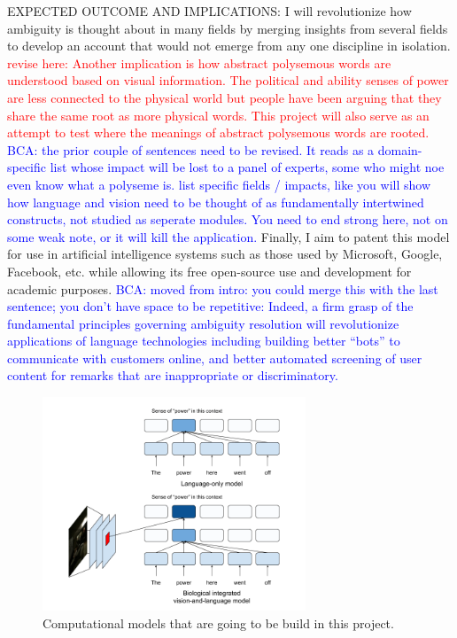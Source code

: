 \documentclass[letterpaper, 12pt]{article}
\newcommand{\bca}[1]{\textcolor{blue}{BCA: #1}} %
\newcommand{\todo}[1]{\textcolor{red}{#1}} %
\begin{document}
EXPECTED OUTCOME AND IMPLICATIONS: I will revolutionize how ambiguity is thought about in many fields by merging insights from several fields to develop an account that would not emerge from any one discipline in isolation. \todo{revise here: Another implication is how abstract polysemous words are understood based on visual information. The political and ability senses of power are less connected to the physical world but people have been arguing that they share the same root as more physical words. This project will also serve as an attempt to test where the meanings of abstract polysemous words are rooted. }  \bca{the prior couple of sentences need to be revised.  It reads as a domain-specific list whose impact will be lost to a panel of experts, some who might noe even know what a polyseme is.  list specific fields / impacts, like you will show how language and vision need to be thought of as fundamentally intertwined constructs, not studied as seperate modules.  You need to end strong here, not on some weak note, or it will kill the application.  }  Finally, I aim to patent this model for use in artificial intelligence systems such as those used by Microsoft, Google, Facebook, etc. while allowing its free open-source use and development for academic purposes.  
\bca{moved from intro: you could merge this with the last sentence; you don't have space to be repetitive: Indeed, a firm grasp of the fundamental principles governing ambiguity resolution will revolutionize applications of language technologies including building better ``bots'' to communicate with customers online, and better automated screening of user content for remarks that are inappropriate or discriminatory.  }


\begin{figure}[h]
\begin{center}
\includegraphics[width=0.7\textwidth,keepaspectratio]{model_figure}
\end{center}
    \caption{Computational models that are going to be build in this project.}
\end{figure}

\newpage
% 

\end{document}
